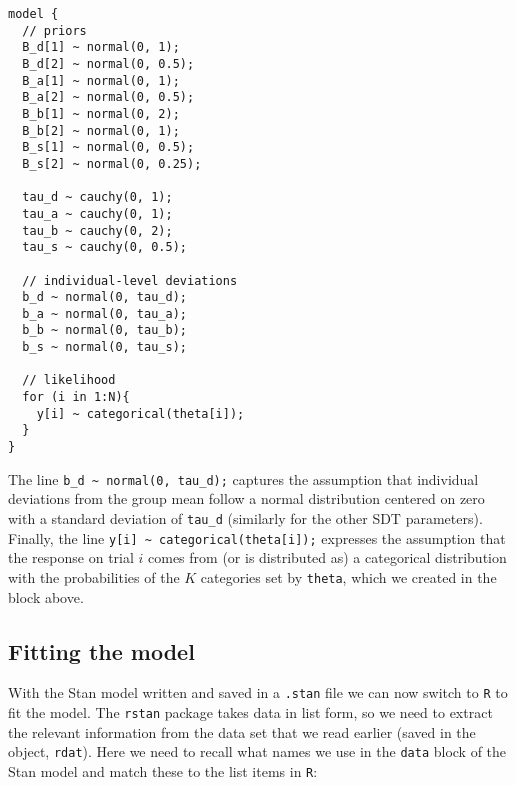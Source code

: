 \documentclass[
  english,
  ,man,floatsintext]{apa6}
\begin{document}
\begin{verbatim}
model {
  // priors
  B_d[1] ~ normal(0, 1);
  B_d[2] ~ normal(0, 0.5);
  B_a[1] ~ normal(0, 1);
  B_a[2] ~ normal(0, 0.5);
  B_b[1] ~ normal(0, 2);
  B_b[2] ~ normal(0, 1);
  B_s[1] ~ normal(0, 0.5);
  B_s[2] ~ normal(0, 0.25);

  tau_d ~ cauchy(0, 1);
  tau_a ~ cauchy(0, 1);
  tau_b ~ cauchy(0, 2);
  tau_s ~ cauchy(0, 0.5);

  // individual-level deviations
  b_d ~ normal(0, tau_d);
  b_a ~ normal(0, tau_a);
  b_b ~ normal(0, tau_b);
  b_s ~ normal(0, tau_s);

  // likelihood
  for (i in 1:N){
    y[i] ~ categorical(theta[i]);
  }
}
\end{verbatim}

The line \texttt{b\_d\ \textasciitilde{}\ normal(0,\ tau\_d);} captures the assumption that individual deviations from the group mean follow a normal distribution centered on zero with a standard deviation of \texttt{tau\_d} (similarly for the other SDT parameters). Finally, the line \texttt{y{[}i{]}\ \textasciitilde{}\ categorical(theta{[}i{]});} expresses the assumption that the response on trial \(i\) comes from (or is distributed as) a categorical distribution with the probabilities of the \(K\) categories set by \texttt{theta}, which we created in the block above.

\hypertarget{fitting-the-model}{%
\subsection{Fitting the model}\label{fitting-the-model}}

With the Stan model written and saved in a \texttt{.stan} file we can now switch to \texttt{R} to fit the model. The \texttt{rstan} package takes data in list form, so we need to extract the relevant information from the data set that we read earlier (saved in the object, \texttt{rdat}). Here we need to recall what names we use in the \texttt{data} block of the Stan model and match these to the list items in \texttt{R}:
\end{document}
